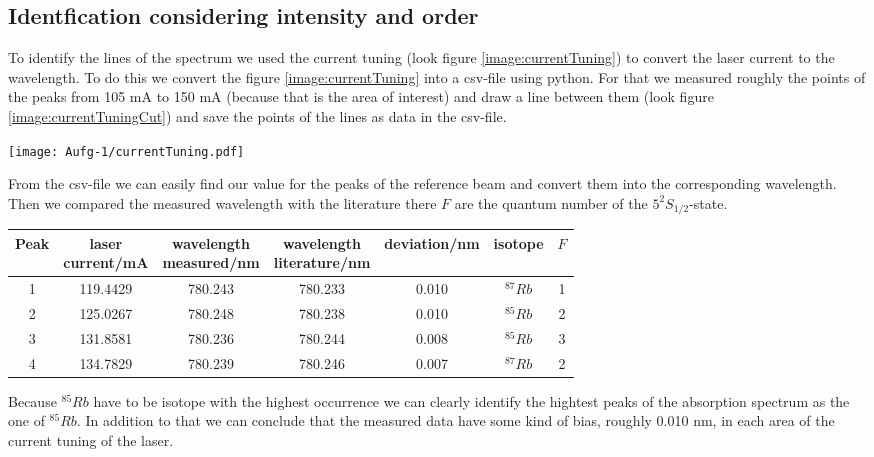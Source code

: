 \subsection*{Identfication considering intensity and order}
To identify the lines of the spectrum we used the current tuning (look figure \ref{image:currentTuning}) to convert the laser current to the wavelength. To do this we convert the figure \ref{image:currentTuning} into a csv-file using python. For that we measured roughly the points of the peaks from 105 mA to 150 mA (because that is the area of interest) and draw a line between them (look figure \ref{image:currentTuningCut}) and save the points of the lines as data in the csv-file.
\begin{center}
    \texttt{[image: Aufg-1/currentTuning.pdf]}
    \label{image:currentTuningCut}
\end{center}
From the csv-file we can easily find our value for the peaks of the reference beam and convert them into the corresponding wavelength. Then we compared the measured wavelength with the literature there $F$ are the quantum number of the $5^2S_{1/2}$-state.
\begin{center}
    \begin{tabular}{c | c | c c c | c c }
        Peak & \makecell{laser\\current/mA} & \makecell{wavelength\\measured/nm} & \makecell{wavelength\\literature/nm} & deviation/nm & isotope & $F$ \\
        \hline
        1 & 119.4429 & 780.243 & 780.233 & 0.010 & $^{87}Rb$ & 1 \\
        2 & 125.0267 & 780.248 & 780.238 & 0.010 & $^{85}Rb$ & 2 \\
        3 & 131.8581 & 780.236 & 780.244 & 0.008 & $^{85}Rb$ & 3 \\
        4 & 134.7829 & 780.239 & 780.246 & 0.007 & $^{87}Rb$ & 2 \\       
    \end{tabular}
\end{center}
Because $^{85}Rb$ have to be isotope with the highest occurrence we can clearly identify the hightest peaks of the absorption spectrum as the one of $^{85}Rb$. In addition to that we can conclude that the measured data have some kind of bias, roughly 0.010 nm, in each area of the current tuning of the laser.